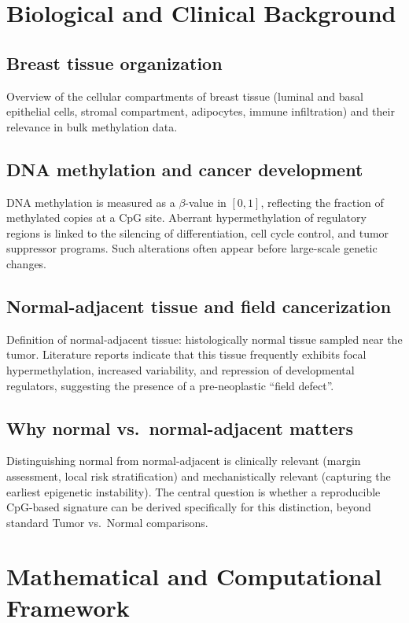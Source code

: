 \documentclass[10pt]{extarticle}
\begin{document}
\section{Biological and Clinical Background}

\subsection{Breast tissue organization}
Overview of the cellular compartments of breast tissue (luminal and basal epithelial cells, stromal compartment, adipocytes, immune infiltration) and their relevance in bulk methylation data.

\subsection{DNA methylation and cancer development}
DNA methylation is measured as a $\beta$-value in $[0,1]$, reflecting the fraction of methylated copies at a CpG site. Aberrant hypermethylation of regulatory regions is linked to the silencing of differentiation, cell cycle control, and tumor suppressor programs. Such alterations often appear before large-scale genetic changes.

\subsection{Normal-adjacent tissue and field cancerization}
Definition of normal-adjacent tissue: histologically normal tissue sampled near the tumor. Literature reports indicate that this tissue frequently exhibits focal hypermethylation, increased variability, and repression of developmental regulators, suggesting the presence of a pre-neoplastic ``field defect''.

\subsection{Why normal vs.\ normal-adjacent matters}
Distinguishing normal from normal-adjacent is clinically relevant (margin assessment, local risk stratification) and mechanistically relevant (capturing the earliest epigenetic instability). The central question is whether a reproducible CpG-based signature can be derived specifically for this distinction, beyond standard Tumor vs.\ Normal comparisons.


\section{Mathematical and Computational Framework}
\end{document}
